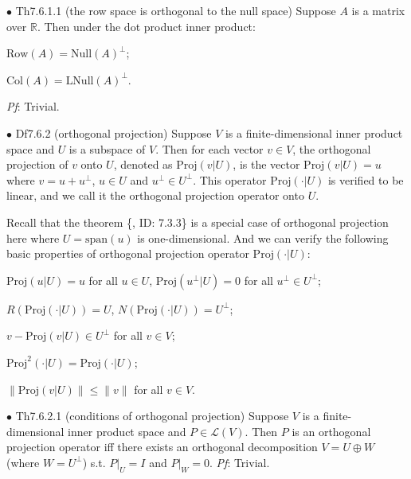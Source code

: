 \documentclass{article}
\begin{document}
\begin{Th}{$\bullet$ Th7.6.1.1 (the row space is orthogonal to the null space)}
    Suppose $A$ is a matrix over $\mathbb{R}$. Then under the dot product inner product:
    \begin{compactenum}
        \item $\text{Row}(A) = \text{Null}(A)^\perp$;
        \item $\text{Col}(A) = \text{LNull}(A)^\perp$.
    \end{compactenum}
    \tcblower
    \textit{Pf}: Trivial.
\end{Th}

\begin{Df}{$\bullet$ Df7.6.2 (orthogonal projection)}
    Suppose $V$ is a finite-dimensional inner product space and $U$ is a subspace of $V$. Then for each vector $v\in V$, the orthogonal projection of $v$ onto $U$, denoted as $\text{Proj}(v|U)$, is the vector $\text{Proj}(v|U) = u$ where $v = u+u^\perp$, $u\in U$ and $u^\perp\in U^\perp$. \textcolor{Th}{This operator $\text{Proj}(\cdot|U)$ is verified to be linear}, and we call it the orthogonal projection operator onto $U$.
\end{Df}

\begin{Rmk}{}
    \textcolor{Th}{Recall that the theorem \{, ID: 7.3.3\} is a special case of orthogonal projection here where $U = \text{span}(u)$ is one-dimensional.} And we can verify the following basic properties of orthogonal projection operator $\text{Proj}(\cdot |U)$: 
    \textcolor{Th}{
    \begin{compactenum}
        \item $\text{Proj}(u|U) = u$ for all $u\in U$, $\text{Proj}(u^\perp|U) = 0$ for all $u^\perp\in U^\perp$;
        \item $R(\text{Proj}(\cdot |U)) = U$, $N(\text{Proj}(\cdot |U)) = U^\perp$;
        \item $v-\text{Proj}(v|U)\in U^\perp$ for all $v\in V$;
        \item $\text{Proj}^2(\cdot |U) = \text{Proj}(\cdot |U)$;
        \item $\|\text{Proj}(v|U)\| \leq \|v\|$ for all $v\in V$.
    \end{compactenum}
    }
\end{Rmk}

\begin{Th}{$\bullet$ Th7.6.2.1 (conditions of orthogonal projection)}
    Suppose $V$ is a finite-dimensional inner product space and $P\in\mathcal{L}(V)$. Then $P$ is an orthogonal projection operator iff there exists an orthogonal decomposition $V = U\oplus W$ (where $W = U^\perp$) s.t. $P|_U = I$ and $P|_W = 0$.
    \tcblower
    \textit{Pf}: Trivial.
\end{Th}
\end{document}

